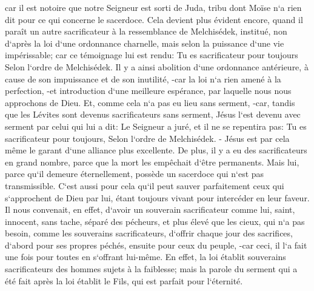 \verse car il est notoire que notre Seigneur est sorti de Juda, tribu dont Moïse n`a rien dit pour ce qui concerne le sacerdoce. 
\verse Cela devient plus évident encore, quand il paraît un autre sacrificateur à la ressemblance de Melchisédek, 
\verse institué, non d`après la loi d`une ordonnance charnelle, mais selon la puissance d`une vie impérissable; 
\verse car ce témoignage lui est rendu: Tu es sacrificateur pour toujours Selon l`ordre de Melchisédek. 
\verse Il y a ainsi abolition d`une ordonnance antérieure, à cause de son impuissance et de son inutilité, 
\verse -car la loi n`a rien amené à la perfection, -et introduction d`une meilleure espérance, par laquelle nous nous approchons de Dieu. 
\verse Et, comme cela n`a pas eu lieu sans serment, 
\verse -car, tandis que les Lévites sont devenus sacrificateurs sans serment, Jésus l`est devenu avec serment par celui qui lui a dit: Le Seigneur a juré, et il ne se repentira pas: Tu es sacrificateur pour toujours, Selon l`ordre de Melchisédek. - 
\verse Jésus est par cela même le garant d`une alliance plus excellente. 
\verse De plus, il y a eu des sacrificateurs en grand nombre, parce que la mort les empêchait d`être permanents. 
\verse Mais lui, parce qu`il demeure éternellement, possède un sacerdoce qui n`est pas transmissible. 
\verse C`est aussi pour cela qu`il peut sauver parfaitement ceux qui s`approchent de Dieu par lui, étant toujours vivant pour intercéder en leur faveur. 
\verse Il nous convenait, en effet, d`avoir un souverain sacrificateur comme lui, saint, innocent, sans tache, séparé des pécheurs, et plus élevé que les cieux, 
\verse qui n`a pas besoin, comme les souverains sacrificateurs, d`offrir chaque jour des sacrifices, d`abord pour ses propres péchés, ensuite pour ceux du peuple, -car ceci, il l`a fait une fois pour toutes en s`offrant lui-même. 
\verse En effet, la loi établit souverains sacrificateurs des hommes sujets à la faiblesse; mais la parole du serment qui a été fait après la loi établit le Fils, qui est parfait pour l`éternité. 

